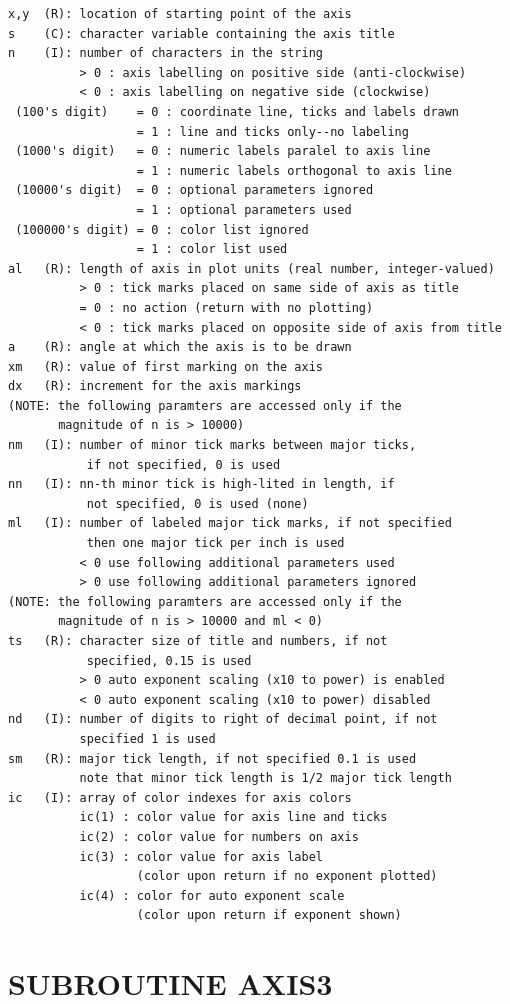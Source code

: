 \documentclass[11pt]{report}
\begin{document}
\begin{verbatim}
x,y  (R): location of starting point of the axis
s    (C): character variable containing the axis title
n    (I): number of characters in the string
          > 0 : axis labelling on positive side (anti-clockwise)
          < 0 : axis labelling on negative side (clockwise)
 (100's digit)    = 0 : coordinate line, ticks and labels drawn
                  = 1 : line and ticks only--no labeling
 (1000's digit)   = 0 : numeric labels paralel to axis line
                  = 1 : numeric labels orthogonal to axis line
 (10000's digit)  = 0 : optional parameters ignored
                  = 1 : optional parameters used
 (100000's digit) = 0 : color list ignored
                  = 1 : color list used
al   (R): length of axis in plot units (real number, integer-valued)
          > 0 : tick marks placed on same side of axis as title
          = 0 : no action (return with no plotting)
          < 0 : tick marks placed on opposite side of axis from title
a    (R): angle at which the axis is to be drawn
xm   (R): value of first marking on the axis
dx   (R): increment for the axis markings
(NOTE: the following paramters are accessed only if the
       magnitude of n is > 10000)
nm   (I): number of minor tick marks between major ticks,
           if not specified, 0 is used
nn   (I): nn-th minor tick is high-lited in length, if
           not specified, 0 is used (none)
ml   (I): number of labeled major tick marks, if not specified
           then one major tick per inch is used
          < 0 use following additional parameters used
          > 0 use following additional parameters ignored
(NOTE: the following paramters are accessed only if the
       magnitude of n is > 10000 and ml < 0)
ts   (R): character size of title and numbers, if not
           specified, 0.15 is used
          > 0 auto exponent scaling (x10 to power) is enabled
          < 0 auto exponent scaling (x10 to power) disabled
nd   (I): number of digits to right of decimal point, if not
          specified 1 is used
sm   (R): major tick length, if not specified 0.1 is used
          note that minor tick length is 1/2 major tick length
ic   (I): array of color indexes for axis colors
          ic(1) : color value for axis line and ticks
          ic(2) : color value for numbers on axis
          ic(3) : color value for axis label 
                  (color upon return if no exponent plotted)
          ic(4) : color for auto exponent scale
                  (color upon return if exponent shown)
\end{verbatim}

\section{SUBROUTINE AXIS3}
\end{document}
